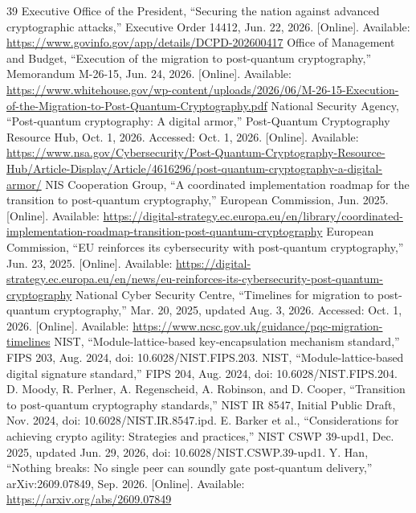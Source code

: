 \begin{thebibliography}{39}
Executive Office of the President, ``Securing the nation against advanced cryptographic attacks,'' Executive Order 14412, Jun. 22, 2026. [Online]. Available: \url{https://www.govinfo.gov/app/details/DCPD-202600417}
Office of Management and Budget, ``Execution of the migration to post-quantum cryptography,'' Memorandum M-26-15, Jun. 24, 2026. [Online]. Available: \url{https://www.whitehouse.gov/wp-content/uploads/2026/06/M-26-15-Execution-of-the-Migration-to-Post-Quantum-Cryptography.pdf}
National Security Agency, ``Post-quantum cryptography: A digital armor,'' Post-Quantum Cryptography Resource Hub, Oct. 1, 2026. Accessed: Oct. 1, 2026. [Online]. Available: \url{https://www.nsa.gov/Cybersecurity/Post-Quantum-Cryptography-Resource-Hub/Article-Display/Article/4616296/post-quantum-cryptography-a-digital-armor/}
NIS Cooperation Group, ``A coordinated implementation roadmap for the transition to post-quantum cryptography,'' European Commission, Jun. 2025. [Online]. Available: \url{https://digital-strategy.ec.europa.eu/en/library/coordinated-implementation-roadmap-transition-post-quantum-cryptography}
European Commission, ``EU reinforces its cybersecurity with post-quantum cryptography,'' Jun. 23, 2025. [Online]. Available: \url{https://digital-strategy.ec.europa.eu/en/news/eu-reinforces-its-cybersecurity-post-quantum-cryptography}
National Cyber Security Centre, ``Timelines for migration to post-quantum cryptography,'' Mar. 20, 2025, updated Aug. 3, 2026. Accessed: Oct. 1, 2026. [Online]. Available: \url{https://www.ncsc.gov.uk/guidance/pqc-migration-timelines}
NIST, ``Module-lattice-based key-encapsulation mechanism standard,'' FIPS 203, Aug. 2024, doi: 10.6028/NIST.FIPS.203.
NIST, ``Module-lattice-based digital signature standard,'' FIPS 204, Aug. 2024, doi: 10.6028/NIST.FIPS.204.
D. Moody, R. Perlner, A. Regenscheid, A. Robinson, and D. Cooper, ``Transition to post-quantum cryptography standards,'' NIST IR 8547, Initial Public Draft, Nov. 2024, doi: 10.6028/NIST.IR.8547.ipd.
E. Barker et al., ``Considerations for achieving crypto agility: Strategies and practices,'' NIST CSWP 39-upd1, Dec. 2025, updated Jun. 29, 2026, doi: 10.6028/NIST.CSWP.39-upd1.
Y. Han, ``Nothing breaks: No single peer can soundly gate post-quantum delivery,'' arXiv:2609.07849, Sep. 2026. [Online]. Available: \url{https://arxiv.org/abs/2609.07849}

\end{thebibliography}
